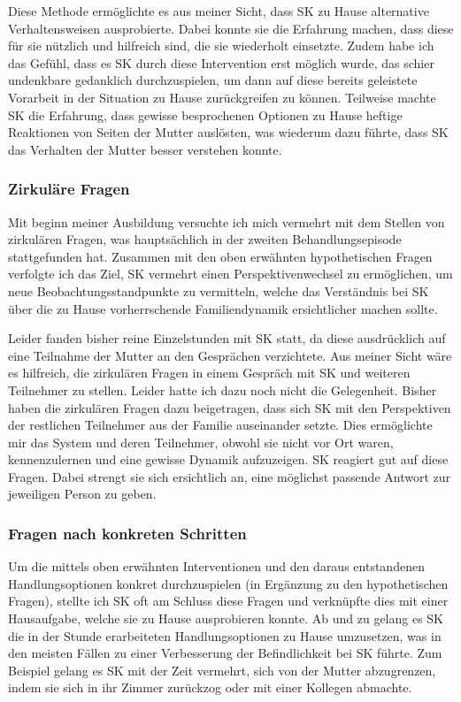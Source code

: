 Diese Methode ermöglichte es aus meiner Sicht, dass SK zu Hause alternative Verhaltensweisen ausprobierte. Dabei konnte sie die Erfahrung machen, dass diese für sie nützlich und hilfreich sind, die sie wiederholt einsetzte. Zudem habe ich das Gefühl, dass es SK durch diese Intervention erst möglich wurde, das schier undenkbare gedanklich durchzuspielen, um dann auf diese bereits geleistete Vorarbeit in der Situation zu Hause zurückgreifen zu können. Teilweise machte SK die Erfahrung, dass gewisse besprochenen Optionen zu Hause  heftige Reaktionen von Seiten der Mutter auslösten, was wiederum dazu führte, dass SK das Verhalten der Mutter besser verstehen konnte. 

\subsubsection{Zirkuläre Fragen}
Mit beginn meiner Ausbildung versuchte ich mich vermehrt mit dem Stellen von zirkulären Fragen, was hauptsächlich in der zweiten Behandlungsepisode stattgefunden hat. Zusammen mit den oben erwähnten hypothetischen Fragen verfolgte ich das Ziel, SK vermehrt einen Perspektivenwechsel zu ermöglichen, um neue Beobachtungsstandpunkte zu vermitteln, welche das Verständnis bei SK über die zu Hause vorherrschende Familiendynamik ersichtlicher machen sollte. 

Leider fanden bisher reine Einzelstunden mit SK statt, da diese ausdrücklich auf eine Teilnahme der Mutter an den Gesprächen verzichtete. Aus meiner Sicht wäre es hilfreich, die zirkulären Fragen in einem Gespräch mit SK und weiteren Teilnehmer zu stellen. Leider hatte ich dazu noch nicht die Gelegenheit. Bisher haben die zirkulären Fragen dazu beigetragen, dass sich SK mit den Perspektiven der restlichen Teilnehmer aus der Familie auseinander setzte. Dies ermöglichte mir das System und deren Teilnehmer, obwohl sie nicht vor Ort waren, kennenzulernen und eine gewisse Dynamik aufzuzeigen. SK reagiert gut auf diese Fragen. Dabei strengt sie sich ersichtlich an, eine möglichst passende Antwort zur jeweiligen Person zu geben.  

\subsubsection{Fragen nach konkreten Schritten}
Um die mittels oben erwähnten Interventionen und den daraus entstandenen Handlungsoptionen konkret durchzuspielen (in Ergänzung zu den hypothetischen Fragen), stellte ich SK oft am Schluss diese Fragen und verknüpfte dies mit einer Hausaufgabe, welche sie zu Hause ausprobieren konnte. Ab und zu gelang es SK die in der Stunde erarbeiteten Handlungsoptionen zu Hause umzusetzen, was in den meisten Fällen zu einer Verbesserung der Befindlichkeit bei SK führte. Zum Beispiel gelang es SK mit der Zeit vermehrt, sich von der Mutter abzugrenzen, indem sie sich in ihr Zimmer zurückzog oder mit einer Kollegen abmachte.

